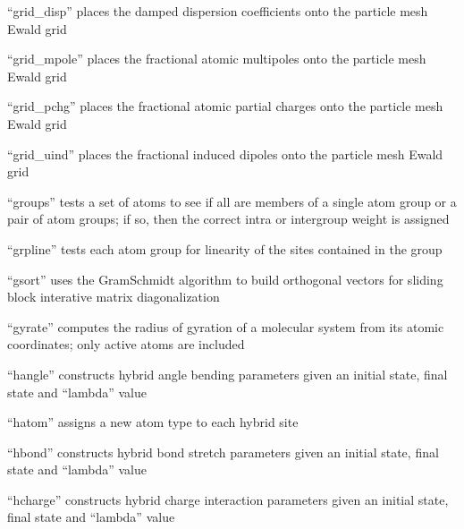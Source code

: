 \documentclass[letterpaper,11pt,english]{sphinxmanual}
\begin{document}

“grid\_disp” places the damped dispersion coefficients onto
the particle mesh Ewald grid


“grid\_mpole” places the fractional atomic multipoles onto
the particle mesh Ewald grid


“grid\_pchg” places the fractional atomic partial charges onto
the particle mesh Ewald grid


“grid\_uind” places the fractional induced dipoles onto the
particle mesh Ewald grid


“groups” tests a set of atoms to see if all are members of a
single atom group or a pair of atom groups; if so, then the
correct intra\sphinxhyphen{} or intergroup weight is assigned


“grpline” tests each atom group for linearity of the sites
contained in the group


“gsort” uses the Gram\sphinxhyphen{}Schmidt algorithm to build orthogonal
vectors for sliding block interative matrix diagonalization


“gyrate” computes the radius of gyration of a molecular system
from its atomic coordinates; only active atoms are included


“hangle” constructs hybrid angle bending parameters given
an initial state, final state and “lambda” value


“hatom” assigns a new atom type to each hybrid site


“hbond” constructs hybrid bond stretch parameters given
an initial state, final state and “lambda” value


“hcharge” constructs hybrid charge interaction parameters
given an initial state, final state and “lambda” value
\end{document}
